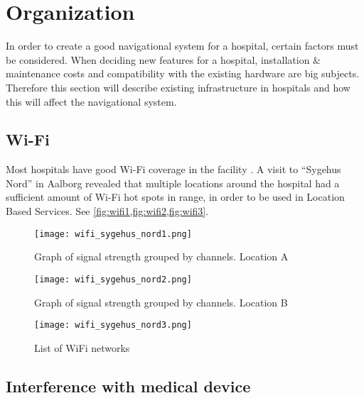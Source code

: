 \section{Organization} %
\label{sec:organization}



In order to create a good navigational system for a hospital, certain factors must be considered. When deciding new features for a hospital, installation \& maintenance costs and compatibility with the existing hardware are big subjects. Therefore this section will describe existing infrastructure in hospitals and how this will affect the navigational system.

\subsection{Wi-Fi} \label{orgwifi}

Most hospitals have good Wi-Fi coverage in the facility \cite{Millionkontrakt_giver_Ca}. A visit to \enquote{Sygehus Nord} in Aalborg revealed that multiple locations around the hospital had a sufficient amount of Wi-Fi hot spots in range, in order to be used in Location Based Services. See \cref{fig:wifi1,fig:wifi2,fig:wifi3}.

\begin{figure}
\centering
  \begin{minipage}{0.45\textwidth}
    \centering
    \texttt{[image: wifi\_sygehus\_nord1.png]}
    \caption{Graph of signal strength grouped by channels. Location A} \label{fig:wifi1}
  \end{minipage}
  \hfill
  \begin{minipage}{0.45\textwidth}
    \centering
    \texttt{[image: wifi\_sygehus\_nord2.png]}
    \caption{Graph of signal strength grouped by channels. Location B} \label{fig:wifi2}
  \end{minipage}
    \begin{minipage}{0.45\textwidth}
    \centering
    \texttt{[image: wifi\_sygehus\_nord3.png]}
    \caption{List of WiFi networks} \label{fig:wifi3}
  \end{minipage}
  \end{figure}


\subsection{Interference with medical device}

